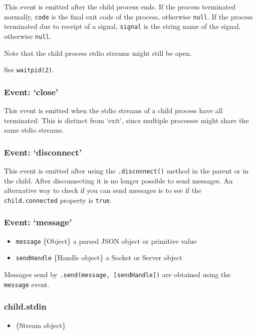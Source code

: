 This event is emitted after the child process ends. If the process
terminated normally, \texttt{code} is the final exit code of the
process, otherwise \texttt{null}. If the process terminated due to
receipt of a signal, \texttt{signal} is the string name of the signal,
otherwise \texttt{null}.

Note that the child process stdio streams might still be open.

See \texttt{waitpid(2)}.

\subsubsection{Event: `close'}

This event is emitted when the stdio streams of a child process have all
terminated. This is distinct from `exit', since multiple processes might
share the same stdio streams.

\subsubsection{Event: `disconnect'}

This event is emitted after using the \texttt{.disconnect()} method in
the parent or in the child. After disconnecting it is no longer possible
to send messages. An alternative way to check if you can send messages
is to see if the \texttt{child.connected} property is \texttt{true}.

\subsubsection{Event: `message'}

\begin{itemize}
\item
  \texttt{message} \{Object\} a parsed JSON object or primitive value
\item
  \texttt{sendHandle} \{Handle object\} a Socket or Server object
\end{itemize}

Messages send by \texttt{.send(message, {[}sendHandle{]})} are obtained
using the \texttt{message} event.

\subsubsection{child.stdin}

\begin{itemize}
\item
  \{Stream object\}
\end{itemize}

